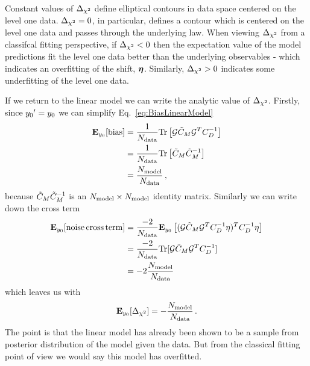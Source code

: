 Constant values of $\Delta_{\chi^2}$ define elliptical contours in data space
centered on the level one data. $\Delta_{\chi^2} = 0$, in particular, defines a
contour which is centered on the level one data and passes through the
underlying law. When viewing $\Delta_{\chi^2}$ from a classifcal fitting perspective,
if $\Delta_{\chi^2} < 0$ then the expectation value of the model
predictions fit the level one data better than the underlying observables -
which indicates an overfitting of the shift, $\boldsymbol{\eta}$. Similarly,
$\Delta_{\chi^2} > 0$ indicates some underfitting of the level one data.

If we return to the linear model we can write the analytic value of
$\Delta_{\chi^2}$. Firstly, since ${{y_0}^{\prime}}=y_0$ we can
simplify Eq.~\ref{eq:BiasLinearModel}
\begin{equation}\label{eq:BiasLinearModelSimple}
    \begin{split}
        \mathbf{E}_{y_0}[{\rm bias}] &= \frac{1}{N_{\rm data}}
            {\rm Tr} \left[
                \mathcal{G} \tilde{C}_M \mathcal{G}^T C_{D}^{-1}
            \right] \\
            &= \frac{1}{N_{\rm data}}{\rm Tr} \left[ \tilde{C}_M \tilde{C}_M^{-1}\right] \\
            &= \frac{N_{\rm model}}{N_{\rm data}} \, ,
    \end{split}
\end{equation}
because $\tilde{C}_M \tilde{C}_M^{-1}$ is an $N_{\rm model} \times N_{\rm model}$ identity
matrix. Similarly we can write down the cross term
\begin{equation}
    \begin{split}
        \mathbf{E}_{y_0}[{\rm noise \, cross \, term}] &= \frac{-2}{N_{\rm data}} \mathbf{E}_{y_0} \left[
            (\mathcal{G} \tilde{C}_M \mathcal{G}^T C_{D}^{-1} \eta)^T C_{D}^{-1} \eta
        \right] \\
        &= \frac{-2}{N_{\rm data}}{\rm Tr} [\mathcal{G} \tilde{C}_M \mathcal{G}^T C_{D}^{-1}] \\
        &= -2 \frac{N_{\rm model}}{N_{\rm data}}
    \end{split}
\end{equation}
which leaves us with
\begin{equation}
    \mathbf{E}_{y_0}[\Delta_{\chi^2}] = - \frac{N_{\rm model}}{N_{\rm data}} \, .
\end{equation}
The point is that the linear model has already been shown to be a sample from
posterior distribution of the model given the data. But from the classical
fitting point of view we would say this model has overfitted.

